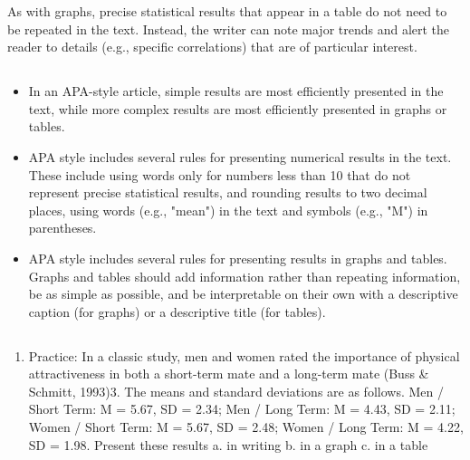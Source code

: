 As with graphs, precise statistical results that appear in a table do not need to be repeated in the text. Instead, the writer can note major trends and alert the reader to details (e.g., specific correlations) that are of particular interest.

\subsection{}
\begin{fullwidth}
\begin{itemize}
\item In an APA-style article, simple results are most efficiently presented in the text, while more complex results are most efficiently presented in graphs or tables.

\item APA style includes several rules for presenting numerical results in the text. These include using words only for numbers less than 10 that do not represent precise statistical results, and rounding results to two decimal places, using words (e.g., "mean") in the text and symbols (e.g., "M") in parentheses.

\item APA style includes several rules for presenting results in graphs and tables. Graphs and tables should add information rather than repeating information, be as simple as possible, and be interpretable on their own with a descriptive caption (for graphs) or a descriptive title (for tables).

\end{itemize}
\end{fullwidth}

 

\subsection{}
\begin{fullwidth}
\begin{enumerate}
\item Practice: In a classic study, men and women rated the importance of physical attractiveness in both a short-term mate and a long-term mate (Buss \& Schmitt, 1993)3. The means and standard deviations are as follows. Men / Short Term: M = 5.67, SD = 2.34; Men / Long Term: M =
4.43, SD = 2.11; Women / Short Term: M = 5.67, SD = 2.48; Women / Long Term: M = 4.22, SD = 1.98. Present these results
a. in writing b. in a graph c. in a table
 
\end{enumerate}
\end{fullwidth}  


